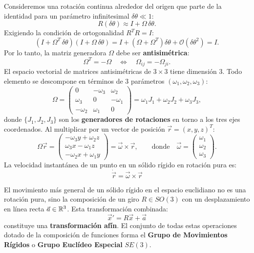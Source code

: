 \documentclass[11pt,letterpaper]{article}
\begin{document}
Consideremos una rotación continua alrededor del origen que parte de la identidad para un parámetro infinitesimal $\delta\theta \ll 1$:
\[
R(\delta\theta) \approx I + \Omega\,\delta\theta.
\]
Exigiendo la condición de ortogonalidad $R^T R = I$:
\[
(I + \Omega^T\,\delta\theta)(I + \Omega\,\delta\theta) = I + (\Omega + \Omega^T)\delta\theta + \mathcal{O}(\delta\theta^2) = I.
\]
Por lo tanto, la matriz generadora $\Omega$ debe ser \textbf{antisimétrica}:
\[
\boxed{\Omega^T = -\Omega} \quad \Longleftrightarrow \quad \Omega_{ij} = -\Omega_{ji}.
\]
El espacio vectorial de matrices antisimétricas de $3 \times 3$ tiene dimensión 3. Todo elemento se descompone en términos de 3 parámetros $(\omega_1, \omega_2, \omega_3)$:
\[
\Omega = \begin{pmatrix} 0 & -\omega_3 & \omega_2 \\ \omega_3 & 0 & -\omega_1 \\ -\omega_2 & \omega_1 & 0 \end{pmatrix} = \omega_1 J_1 + \omega_2 J_2 + \omega_3 J_3,
\]
donde $\{J_1, J_2, J_3\}$ son los \textbf{generadores de rotaciones} en torno a los tres ejes coordenados.
Al multiplicar por un vector de posición $\vec{r} = (x, y, z)^T$:
\[
\Omega\vec{r} = \begin{pmatrix} -\omega_3 y + \omega_2 z \\ \omega_3 x - \omega_1 z \\ -\omega_2 x + \omega_1 y \end{pmatrix} = \vec{\omega} \times \vec{r}, \qquad \text{donde} \quad \vec{\omega} = \begin{pmatrix} \omega_1 \\ \omega_2 \\ \omega_3 \end{pmatrix}.
\]
La velocidad instantánea de un punto en un sólido rígido en rotación pura es:
\[
\boxed{\dot{\vec{r}} = \vec{\omega} \times \vec{r}}
\]


El movimiento más general de un sólido rígido en el espacio euclidiano no es una rotación pura, sino la composición de un giro $R \in SO(3)$ con un desplazamiento en línea recta $\vec{a} \in \mathbb{R}^3$. Esta transformación combinada:
\[
\vec{x}' = R\vec{x} + \vec{a}
\]
constituye una \textbf{transformación afín}. El conjunto de todas estas operaciones dotado de la composición de funciones forma el \textbf{Grupo de Movimientos Rígidos} o \textbf{Grupo Euclídeo Especial} $SE(3)$.
\end{document}
